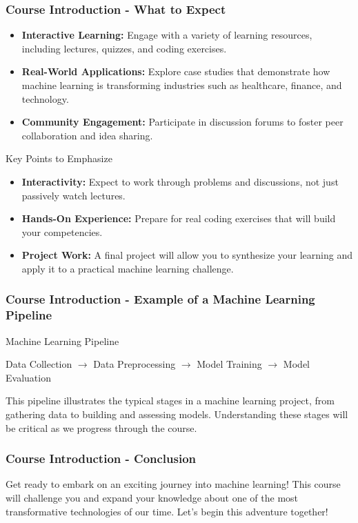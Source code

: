 \documentclass[aspectratio=169]{beamer}
\begin{document}
\begin{frame}[fragile]
    \frametitle{Course Introduction - What to Expect}
    \begin{itemize}
        \item \textbf{Interactive Learning:} Engage with a variety of learning resources, including lectures, quizzes, and coding exercises.
        \item \textbf{Real-World Applications:} Explore case studies that demonstrate how machine learning is transforming industries such as healthcare, finance, and technology.
        \item \textbf{Community Engagement:} Participate in discussion forums to foster peer collaboration and idea sharing.
    \end{itemize}

    \begin{block}{Key Points to Emphasize}
        \begin{itemize}
            \item \textbf{Interactivity:} Expect to work through problems and discussions, not just passively watch lectures.
            \item \textbf{Hands-On Experience:} Prepare for real coding exercises that will build your competencies.
            \item \textbf{Project Work:} A final project will allow you to synthesize your learning and apply it to a practical machine learning challenge.
        \end{itemize}
    \end{block}
\end{frame}

\begin{frame}[fragile]
    \frametitle{Course Introduction - Example of a Machine Learning Pipeline}
    \begin{block}{Machine Learning Pipeline}
    \begin{center}
        Data Collection $\rightarrow$ Data Preprocessing $\rightarrow$ Model Training $\rightarrow$ Model Evaluation 
    \end{center}
    \end{block}

    This pipeline illustrates the typical stages in a machine learning project, from gathering data to building and assessing models. Understanding these stages will be critical as we progress through the course.
\end{frame}

\begin{frame}[fragile]
    \frametitle{Course Introduction - Conclusion}
    Get ready to embark on an exciting journey into machine learning! This course will challenge you and expand your knowledge about one of the most transformative technologies of our time. Let’s begin this adventure together!
\end{frame}
\end{document}
